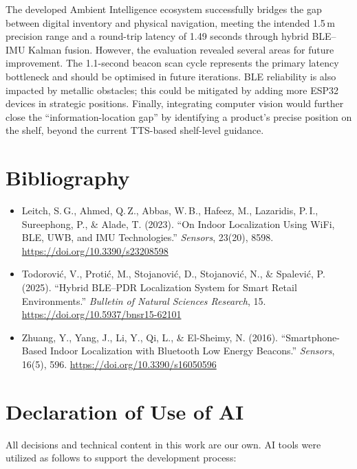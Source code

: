 \documentclass[12pt,a4paper]{article}
\begin{document}
The developed Ambient Intelligence ecosystem successfully bridges the gap between digital inventory and physical navigation, meeting the intended 1.5\,m precision range and a round-trip latency of 1.49 seconds through hybrid BLE--IMU Kalman fusion.
However, the evaluation revealed several areas for future improvement. The 1.1-second beacon scan cycle represents the primary latency bottleneck and should be optimised in future iterations. BLE reliability is also impacted by metallic obstacles; this could be mitigated by adding more ESP32 devices in strategic positions. Finally, integrating computer vision would further close the ``information-location gap'' by identifying a product's precise position on the shelf, beyond the current TTS-based shelf-level guidance.


\section{Bibliography}

\begin{itemize}
    \item Leitch, S.\,G., Ahmed, Q.\,Z., Abbas, W.\,B., Hafeez, M.,
    Lazaridis, P.\,I., Sureephong, P., \& Alade, T. (2023). ``On Indoor
    Localization Using WiFi, BLE, UWB, and IMU Technologies.'' \textit{Sensors},
    23(20), 8598. \url{https://doi.org/10.3390/s23208598}

    \item Todorović, V., Protić, M., Stojanović, D., Stojanović, N., \&
    Spalević, P. (2025). ``Hybrid BLE--PDR Localization System for Smart Retail
    Environments.'' \textit{Bulletin of Natural Sciences Research}, 15.
    \url{https://doi.org/10.5937/bnsr15-62101}

    \item Zhuang, Y., Yang, J., Li, Y., Qi, L., \& El-Sheimy, N. (2016).
    ``Smartphone-Based Indoor Localization with Bluetooth Low Energy Beacons.''
    \textit{Sensors}, 16(5), 596. \url{https://doi.org/10.3390/s16050596}
\end{itemize}

\section{Declaration of Use of AI}

All decisions and technical content in this work are our own. AI tools were utilized as follows to support the development process:
\end{document}
